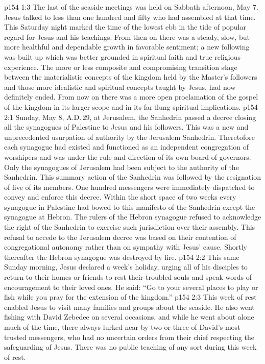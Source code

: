 \vs p154 1:3 The last of the seaside meetings was held on Sabbath afternoon, May 7. Jesus talked to less than one hundred and fifty who had assembled at that time. This Saturday night marked the time of the lowest ebb in the tide of popular regard for Jesus and his teachings. From then on there was a steady, slow, but more healthful and dependable growth in favorable sentiment; a new following was built up which was better grounded in spiritual faith and true religious experience. The more or less composite and compromising transition stage between the materialistic concepts of the kingdom held by the Master’s followers and those more idealistic and spiritual concepts taught by Jesus, had now definitely ended. From now on there was a more open proclamation of the gospel of the kingdom in its larger scope and in its far\hyp{}flung spiritual implications.
\vs p154 2:1 Sunday, May 8, A.D.\,29, at Jerusalem, the Sanhedrin passed a decree closing all the synagogues of Palestine to Jesus and his followers. This was a new and unprecedented usurpation of authority by the Jerusalem Sanhedrin. Theretofore each synagogue had existed and functioned as an independent congregation of worshipers and was under the rule and direction of its own board of governors. Only the synagogues of Jerusalem had been subject to the authority of the Sanhedrin. This summary action of the Sanhedrin was followed by the resignation of five of its members. One hundred messengers were immediately dispatched to convey and enforce this decree. Within the short space of two weeks every synagogue in Palestine had bowed to this manifesto of the Sanhedrin except the synagogue at Hebron. The rulers of the Hebron synagogue refused to acknowledge the right of the Sanhedrin to exercise such jurisdiction over their assembly. This refusal to accede to the Jerusalem decree was based on their contention of congregational autonomy rather than on sympathy with Jesus’ cause. Shortly thereafter the Hebron synagogue was destroyed by fire.
\vs p154 2:2 \pc This same Sunday morning, Jesus declared a week’s holiday, urging all of his disciples to return to their homes or friends to rest their troubled souls and speak words of encouragement to their loved ones. He said: \textcolor{ubdarkred}{“Go to your several places to play or fish while you pray for the extension of the kingdom.”}
\vs p154 2:3 This week of rest enabled Jesus to visit many families and groups about the seaside. He also went fishing with David Zebedee on several occasions, and while he went about alone much of the time, there always lurked near by two or three of David’s most trusted messengers, who had no uncertain orders from their chief respecting the safeguarding of Jesus. There was no public teaching of any sort during this week of rest.
